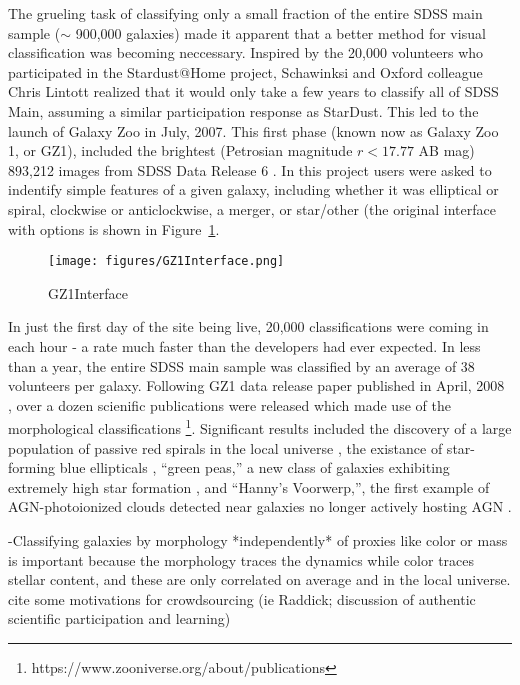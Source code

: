 The grueling task of classifying only a small fraction of the entire SDSS main sample ($\sim$ 900,000 galaxies) made it apparent that a better method for visual classification was becoming neccessary. Inspired by the 20,000 volunteers who participated in the Stardust@Home project, Schawinksi and Oxford colleague Chris Lintott realized that it would only take a few years to classify all of SDSS Main, assuming a similar participation response as StarDust. This led to the launch of Galaxy Zoo in July, 2007. This first phase (known now as Galaxy Zoo 1, or GZ1), included the brightest (Petrosian magnitude $r < 17.77$ AB mag) 893,212 images from SDSS Data Release 6 \citep{Strauss2002,AdelmanMcCarthy2008}. In this project users were asked to indentify simple features of a given galaxy, including whether it was elliptical or spiral, clockwise or anticlockwise, a merger, or star/other (the original interface with options is shown in Figure~\ref{GZ1_Interface}. 

\begin{figure}
\centering
\texttt{[image: figures/GZ1Interface.png]}
\caption{GZ1Interface}
\label{GZ1_Interface}
\end{figure}

In just the first day of the site being live, 20,000 classifications were coming in each hour - a rate much faster than the developers had ever expected. In less than a year, the entire SDSS main sample was classified by an average of 38 volunteers per galaxy. Following GZ1 data release paper published in April, 2008 \citep{Lintott2008}, over a dozen scienific publications were released which made use of the morphological classifications \footnote{https://www.zooniverse.org/about/publications}. Significant results included the discovery of a large population of passive red spirals in the local universe \citep{Masters2010}, the existance of star-forming blue ellipticals \citep{Schawinski2009b}, ``green peas,'' a new class of galaxies exhibiting extremely high star formation \citep{Cardamone2009}, and ``Hanny's Voorwerp,'', the first example of AGN-photoionized clouds detected near galaxies no longer actively hosting AGN \citep{Lintott2009}.

-Classifying galaxies by morphology *independently* of proxies like color or mass is important because the morphology traces the dynamics while color traces stellar content, and these are only correlated on average and in the local universe. 
cite some motivations for crowdsourcing (ie Raddick; discussion of authentic scientific participation and learning)




